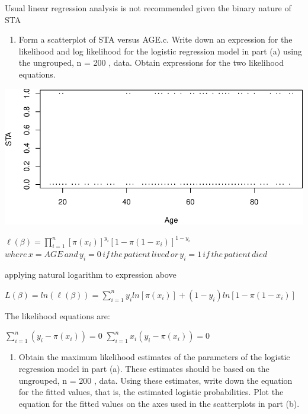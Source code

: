 \documentclass[]{article}
\begin{document}
Usual linear regression analysis is not recommended given the binary
nature of STA

\begin{enumerate}
\def\labelenumi{\alph{enumi}.}
\setcounter{enumi}{1}
\itemsep1pt\parskip0pt
\item
  Form a scatterplot of STA versus AGE.c. Write down an expression for
  the likelihood and log likelihood for the logistic regression model in
  part (a) using the ungrouped, n = 200 , data. Obtain expressions for
  the two likelihood equations.
\end{enumerate}

\begin{center}\includegraphics{HomeworkWeek1_files/figure-latex/unnamed-chunk-4-1} \end{center}

$\ell(\beta)=\prod_{i=1}^{n}[\pi(x_i)]^{y_i}[1-\pi(1-x_i)]^{1-y_i}$\\$where\,x=AGE\,and\,y_i=0\,if\,the\,patient\,lived\,or\,y_i=1\,if\,the\,patient\,died$

applying natural logarithm to expression above

$L(\beta)=ln(\ell(\beta))=\sum_{i=1}^{n}y_iln[\pi(x_i)]+(1-y_i)ln[1-\pi(1-x_i)]$

The likelihood equations are:

$\sum_{i=1}^{n}(y_i-\pi(x_i))=0$ $\sum_{i=1}^{n}x_i(y_i-\pi(x_i))=0$

\begin{enumerate}
\def\labelenumi{\alph{enumi}.}
\setcounter{enumi}{3}
\itemsep1pt\parskip0pt
\item
  Obtain the maximum likelihood estimates of the parameters of the
  logistic regression model in part (a). These estimates should be based
  on the ungrouped, n = 200 , data. Using these estimates, write down
  the equation for the fitted values, that is, the estimated logistic
  probabilities. Plot the equation for the fitted values on the axes
  used in the scatterplots in part (b).
\end{enumerate}
\end{document}
